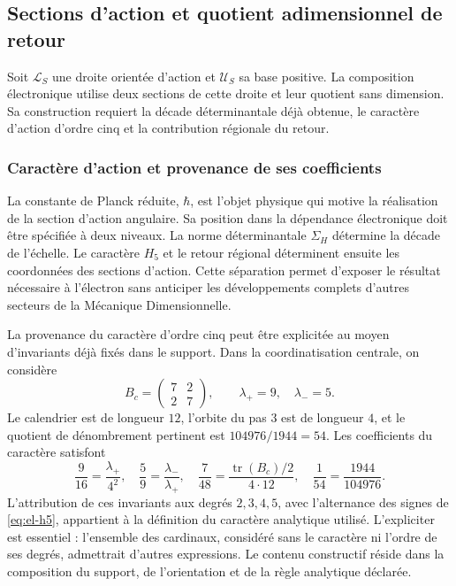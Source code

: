 \subsection{Sections d'action et quotient adimensionnel de retour}

Soit \(\mathcal L_S\) une droite orientée d'action et \(\mathcal U_S\)
sa base positive. La composition électronique utilise deux sections de
cette droite et leur quotient sans dimension. Sa construction requiert la
décade déterminantale déjà obtenue, le caractère d'action d'ordre cinq
et la contribution régionale du retour.

\subsubsection{Caractère d'action et provenance de ses coefficients}
\label{sec:revision-planck}

La constante de Planck réduite, \(\hbar\), est l'objet physique qui
motive la réalisation de la section d'action angulaire. Sa position dans
la dépendance électronique doit être spécifiée à deux niveaux. La norme
déterminantale \(\Sigma_H\) détermine la décade de l'échelle. Le caractère
\(H_5\) et le retour régional déterminent ensuite les coordonnées des
sections d'action. Cette séparation permet d'exposer le résultat
nécessaire à l'électron sans anticiper les développements complets
d'autres secteurs de la Mécanique Dimensionnelle.

La provenance du caractère d'ordre cinq peut être explicitée au moyen
d'invariants déjà fixés dans le support. Dans la coordinatisation centrale, on considère
\[
 B_c=\begin{pmatrix}7&2\\2&7\end{pmatrix},
 \qquad \lambda_+=9,\quad\lambda_-=5.
\]
Le calendrier est de longueur \(12\), l'orbite du pas \(3\) est de
longueur \(4\), et le quotient de dénombrement pertinent est
\(104976/1944=54\). Les coefficients du caractère satisfont
\begin{equation}
 \frac9{16}=\frac{\lambda_+}{4^2},\quad
 \frac59=\frac{\lambda_-}{\lambda_+},\quad
 \frac7{48}=\frac{\operatorname{tr}(B_c)/2}{4\cdot12},\quad
 \frac1{54}=\frac{1944}{104976}.
 \label{eq:revision-h5-coeficientes}
\end{equation}
L'attribution de ces invariants aux degrés \(2,3,4,5\), avec
l'alternance des signes de \eqref{eq:el-h5}, appartient à la définition du
caractère analytique utilisé. L'expliciter est essentiel : l'ensemble des
cardinaux, considéré sans le caractère ni l'ordre de ses degrés,
admettrait d'autres expressions. Le contenu constructif réside dans la
composition du support, de l'orientation et de la règle analytique déclarée.

